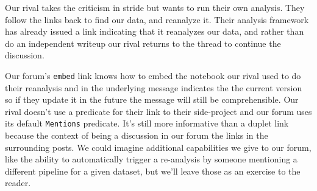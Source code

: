 Our rival takes the criticism in stride but wants to run their own
analysis. They follow the links back to find our data, and reanalyze it.
Their analysis framework has already issued a link indicating that it
reanalyzes our data, and rather than do an independent writeup our rival
returns to the thread to continue the discussion.

\begin{Shaded}
\begin{Highlighting}[]



\end{Highlighting}
\end{Shaded}

Our forum's \texttt{embed} link knows how to embed the notebook our
rival used to do their reanalysis and in the underlying message
indicates the the current version so if they update it in the future the
message will still be comprehensible. Our rival doesn't use a predicate
for their link to their side-project and our forum uses its default
\texttt{Mentions} predicate. It's still more informative than a duplet
link because the context of being a discussion in our forum the links in
the surrounding posts. We could imagine additional capabilities we give
to our forum, like the ability to automatically trigger a re-analysis by
someone mentioning a different pipeline for a given dataset, but we'll
leave those as an exercise to the reader.

